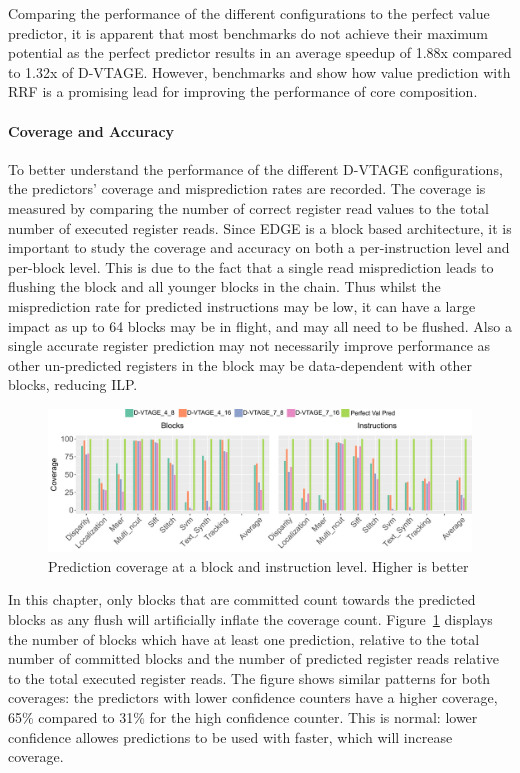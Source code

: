 Comparing the performance of the different configurations to the perfect value predictor, it is apparent that most benchmarks do not achieve their maximum potential as the perfect predictor results in an average speedup of 1.88x compared to 1.32x of D-VTAGE.
However, benchmarks  and  show how value prediction with RRF is a promising lead for improving the performance of core composition.

\paragraph*{Coverage and Accuracy}
To better understand the performance of the different D-VTAGE configurations, the predictors' coverage and misprediction rates are recorded.
The coverage is measured by comparing the number of correct register read values to the total number of executed register reads.
Since EDGE is a block based architecture, it is important to study the coverage and accuracy on both a per-instruction level and per-block level.
This is due to the fact that a single read misprediction leads to flushing the block and all younger blocks in the chain.
Thus whilst the misprediction rate for predicted instructions may be low, it can have a large impact as up to 64 blocks may be in flight, and may all need to be flushed.
Also a single accurate register prediction may not necessarily improve performance as other un-predicted registers in the block may be data-dependent with other blocks, reducing ILP.

\begin{figure}[t]
    \centering
    \includegraphics[width=1\textwidth]{chapter3/graphics/coverageFull.pdf}
    \caption{Prediction coverage at a block and instruction level. Higher is better}
    \label{fig:vtag_cov_block}
	\vspace{1em}
\end{figure}

In this chapter, only blocks that are committed count towards the predicted blocks as any flush will artificially inflate the coverage count.
Figure~\ref{fig:vtag_cov_block} displays the number of blocks which have at least one prediction, relative to the total number of committed blocks and the number of predicted register reads relative to the total executed register reads.
The figure shows similar patterns for both coverages: the predictors with lower confidence counters have a higher coverage, 65\% compared to 31\% for the high confidence counter.
This is normal: lower confidence allowes predictions to be used with faster, which will increase coverage.

